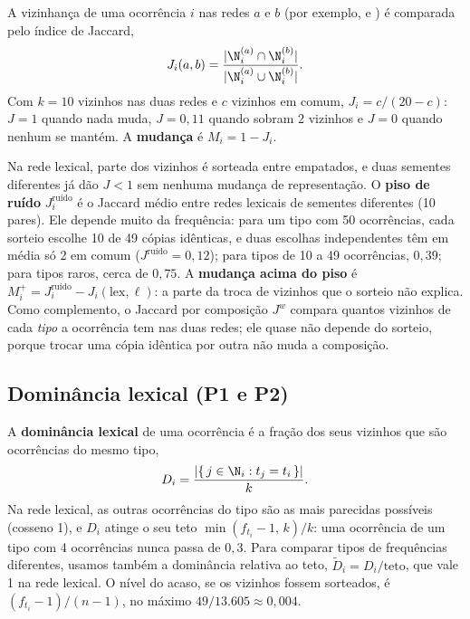 A vizinhança de uma ocorrência $i$ nas redes $a$ e $b$ (por exemplo,  e )
é comparada pelo índice de Jaccard,
\begin{equation}
    J_i(a,b)=\frac{|\N_i^{(a)}\cap\N_i^{(b)}|}{|\N_i^{(a)}\cup\N_i^{(b)}|}.
\end{equation}
Com $k=10$ vizinhos nas duas redes e $c$ vizinhos em comum, $J_i=c/(20-c)$: $J=1$ quando nada
muda, $J=0{,}11$ quando sobram 2 vizinhos e $J=0$ quando nenhum se mantém. A
\textbf{mudança} é $M_i=1-J_i$.

Na rede lexical, parte dos vizinhos é sorteada entre empatados, e duas sementes diferentes já
dão $J<1$ sem nenhuma mudança de representação. O \textbf{piso de ruído} $J^{\text{ruído}}_i$
é o Jaccard médio entre redes lexicais de sementes diferentes (10 pares). Ele depende muito da
frequência: para um tipo com 50 ocorrências, cada sorteio escolhe 10 de 49 cópias idênticas, e
duas escolhas independentes têm em média só 2 em comum ($J^{\text{ruído}}=0{,}12$); para tipos
de 10 a 49 ocorrências, $0{,}39$; para tipos raros, cerca de $0{,}75$. A \textbf{mudança acima
do piso} é $M^{+}_i=J^{\text{ruído}}_i-J_i(\mathrm{lex},\ell)$: a parte da troca de vizinhos que
o sorteio não explica. Como complemento, o Jaccard por composição $J^w$ compara quantos vizinhos
de cada \emph{tipo} a ocorrência tem nas duas redes; ele quase não depende do sorteio,
porque trocar uma cópia idêntica por outra não muda a composição.

\subsection{Dominância lexical (P1 e P2)}\label{sec:met-dominancia}

A \textbf{dominância lexical} de uma ocorrência é a fração dos seus vizinhos que são
ocorrências do mesmo tipo,
\begin{equation}
    D_i=\frac{|\{\,j\in\N_i : t_j=t_i\,\}|}{k}.
\end{equation}
Na rede lexical, as outras ocorrências do tipo são as mais parecidas possíveis (cosseno 1), e
$D_i$ atinge o seu teto $\min(f_{t_i}-1,\,k)/k$: uma ocorrência de um tipo com 4 ocorrências
nunca passa de $0{,}3$. Para comparar tipos de frequências diferentes, usamos também a
dominância relativa ao teto, $\tilde D_i=D_i/\text{teto}$, que vale 1 na rede lexical. O nível
do acaso, se os vizinhos fossem sorteados, é $(f_{t_i}-1)/(n-1)$, no máximo
$49/13.605\approx0{,}004$.

